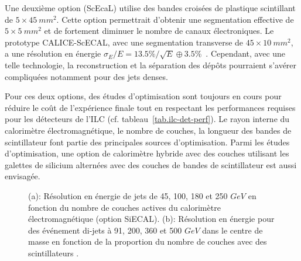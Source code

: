 Une deuxième option (ScEcaL) utilise des bandes croisées de plastique scintillant de $5\times45~mm^2$. Cette option permettrait d'obtenir une segmentation effective de $5\times5~mm^2$ et de fortement diminuer le nombre de canaux électroniques. Le prototype CALICE-ScECAL, avec une segmentation transverse de $45\times10~mm^2$, a une résolution en énergie $\sigma_E/E=13.5\%/\sqrt{E}\oplus3.5\%$~\cite{calice-scecal}. Cependant, avec une telle technologie, la reconstruction et la séparation des dépôts pourraient s'avérer compliquées notamment pour des jets denses. 

Pour ces deux options, des études d'optimisation sont toujours en cours pour réduire le coût de l'expérience finale tout en respectant les performances requises pour les détecteurs de l'ILC (cf. tableau~\ref{tab.ilc-det-perf}). Le rayon interne du calorimètre électromagnétique, le nombre de couches, la longueur des bandes de scintillateur font partie des principales sources d'optimisation. Parmi les études d'optimisation, une option de calorimètre hybride avec des couches utilisant les galettes de silicium alternées avec des couches de bandes de scintillateur est aussi envisagée. 
\begin{figure}[!ht]
  \begin{center}
    \caption{(a): Résolution en énergie de jets de 45, 100, 180 et 250 $GeV$ en fonction du nombre de couches actives du calorimètre électromagnétique (option SiECAL). (b): Résolution en énergie pour des événement di-jets à 91, 200, 360 et 500 $GeV$ dans le centre de masse en fonction de la proportion du nombre de couches avec des scintillateurs \cite{detectorTDR}.}
    \label{fig:ecalOpt}
  \end{center}
\end{figure}
